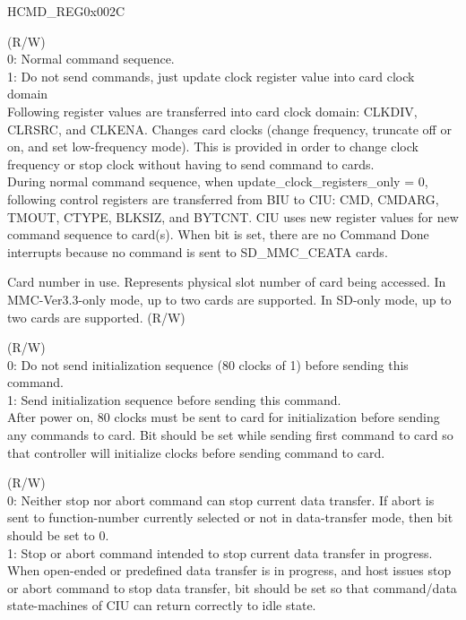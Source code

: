 \begin{register}{H}{CMD\_REG}{0x002C}
\begin{regdesc}\begin{reglist}
\item [Continued from the previous page...]
\item [UPDATE\_CLOCK\_REGISTERS\_ONLY] (R/W)\\
0: Normal command sequence.\\
1: Do not send commands, just update clock register value into card clock domain\\
Following register values are transferred into card clock domain: CLKDIV, CLRSRC, and CLKENA.
Changes card clocks (change frequency, truncate off or on, and set low-frequency mode). This is provided in order to change clock frequency or stop clock without having to send command to cards.\\ During normal command sequence, when update\_clock\_registers\_only = 0, following control registers are transferred from BIU to CIU: CMD, CMDARG, TMOUT, CTYPE, BLKSIZ, and BYTCNT. CIU uses new register values for new command sequence to card(s). When bit is set, there are no Command Done interrupts because no command is sent to SD\_MMC\_CEATA cards.
\item [CARD\_NUMBER]Card number in use. Represents physical slot number of card being accessed. In MMC-Ver3.3-only mode, up to two cards are supported. In SD-only mode, up to two cards are supported. (R/W)
\item [SEND\_INITIALIZATION] (R/W)\\
0: Do not send initialization sequence (80 clocks of 1) before sending this command.\\
1: Send initialization sequence before sending this command.\\
After power on, 80 clocks must be sent to card for initialization before sending any commands to card. Bit should be set while sending first command to card so that controller will initialize clocks before sending command to card.
\item [STOP\_ABORT\_CMD] (R/W)\\
0: Neither stop nor abort command can stop current data transfer. If abort is sent to function-number currently selected or not in data-transfer mode, then bit should be set to 0.\\
1: Stop or abort command intended to stop current data transfer in progress. When open-ended or predefined data transfer is in progress, and host issues stop or abort command to stop data transfer, bit should be set so that command/data state-machines of CIU can return correctly to idle state.

\end{reglist}
\end{regdesc}
\end{register}
